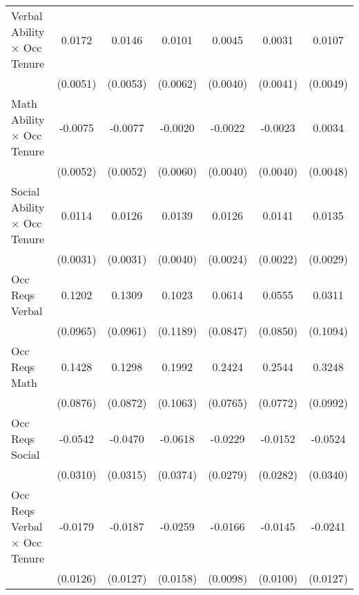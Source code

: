 {\begin{longtable}{l*{6}{c}}
Verbal Ability $\times$ Occ Tenure&      0.0172\sym{***}&      0.0146\sym{***}&      0.0101         &      0.0045         &      0.0031         &      0.0107\sym{**} \\
                    &    (0.0051)         &    (0.0053)         &    (0.0062)         &    (0.0040)         &    (0.0041)         &    (0.0049)         \\
Math Ability $\times$ Occ Tenure&     -0.0075         &     -0.0077         &     -0.0020         &     -0.0022         &     -0.0023         &      0.0034         \\
                    &    (0.0052)         &    (0.0052)         &    (0.0060)         &    (0.0040)         &    (0.0040)         &    (0.0048)         \\
Social Ability $\times$ Occ Tenure&      0.0114\sym{***}&      0.0126\sym{***}&      0.0139\sym{***}&      0.0126\sym{***}&      0.0141\sym{***}&      0.0135\sym{***}\\
                    &    (0.0031)         &    (0.0031)         &    (0.0040)         &    (0.0024)         &    (0.0022)         &    (0.0029)         \\
Occ Reqs Verbal     &      0.1202         &      0.1309         &      0.1023         &      0.0614         &      0.0555         &      0.0311         \\
                    &    (0.0965)         &    (0.0961)         &    (0.1189)         &    (0.0847)         &    (0.0850)         &    (0.1094)         \\
Occ Reqs Math       &      0.1428         &      0.1298         &      0.1992\sym{*}  &      0.2424\sym{***}&      0.2544\sym{***}&      0.3248\sym{***}\\
                    &    (0.0876)         &    (0.0872)         &    (0.1063)         &    (0.0765)         &    (0.0772)         &    (0.0992)         \\
Occ Reqs Social     &     -0.0542\sym{*}  &     -0.0470         &     -0.0618\sym{*}  &     -0.0229         &     -0.0152         &     -0.0524         \\
                    &    (0.0310)         &    (0.0315)         &    (0.0374)         &    (0.0279)         &    (0.0282)         &    (0.0340)         \\
Occ Reqs Verbal $\times$ Occ Tenure&     -0.0179         &     -0.0187         &     -0.0259         &     -0.0166\sym{*}  &     -0.0145         &     -0.0241\sym{*}  \\
                    &    (0.0126)         &    (0.0127)         &    (0.0158)         &    (0.0098)         &    (0.0100)         &    (0.0127)         \\

\end{longtable}}
